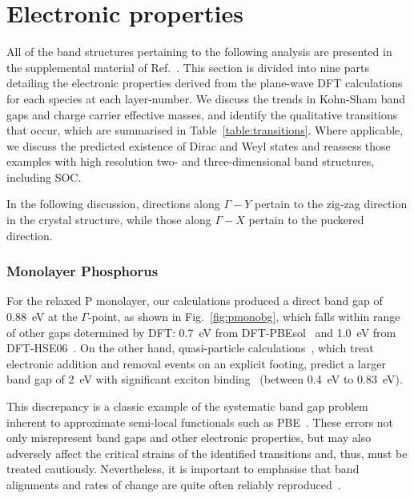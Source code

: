 \section{Electronic properties}
\label{sec:electronic_results}

All of the band structures 
pertaining to the following analysis 
are presented in 
the supplemental material of Ref.~\cite{2053-1583-4-4-045018}.
%
This section is divided 
into nine parts detailing 
the electronic properties  
derived from the plane-wave DFT calculations 
for each species at each layer-number. 
%
We discuss the trends 
in Kohn-Sham band gaps 
and charge carrier effective masses, 
and identify the qualitative transitions that occur, 
which are summarised in Table~\ref{table:transitions}.
%
Where applicable, 
we discuss the predicted 
existence of Dirac and Weyl states 
and reassess those examples 
with high resolution 
two- and three-dimensional band structures, 
including SOC.

In the following discussion, 
directions along $\Gamma-Y$ 
pertain to the zig-zag direction in the crystal structure, 
while those along $\Gamma-X$ 
pertain to the puckered direction.

\subsubsection{Monolayer Phosphorus}

For the relaxed P monolayer, 
our calculations produced  
a direct band gap of 0.88~eV 
at the $\Gamma$-point, 
as shown in Fig.~\ref{fig:pmonobg}, 
which falls within range of other gaps 
determined by DFT: 0.7~eV from DFT-PBEsol~\cite{PhysRevLett.112.176801}
and 1.0~eV from DFT-HSE06~\cite{doi:10.1021/nn501226z}.
%
On the other hand, quasi-particle calculations~\cite{PhysRevB.89.235319}, 
which treat electronic addition and removal events on an explicit footing, 
predict a larger band gap of 2~eV
with significant exciton binding~\cite{PhysRevB.90.205421} 
(between 0.4~eV to 0.83~eV).

This discrepancy is a classic example of 
the systematic 
band gap problem inherent to approximate 
semi-local functionals
such as PBE~\cite{PhysRevB.77.115123}.
%
These errors not only misrepresent  
band gaps and other electronic properties, 
but may also adversely 
affect the critical strains of the identified transitions 
and, thus, must be treated cautiously.
%
Nevertheless, 
it is important to emphasise that
band alignments and rates of change 
are quite often reliably reproduced~\cite{PhysRevB.90.155405}.

